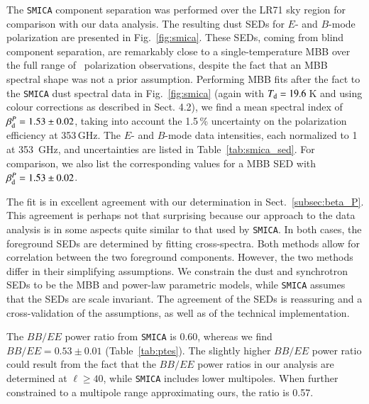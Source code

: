 \documentclass[longauth,traditabstract]{aa}
\begin{document}
The {\tt SMICA} component separation was performed over the LR71 sky region for comparison with our data analysis. 
The resulting dust SEDs for $E$- and $B$-mode polarization are presented in Fig.~\ref{fig:smica}.
These SEDs, coming from blind component separation, are remarkably close to a single-temperature MBB over the full range of \Planck\ polarization observations, despite the fact that an MBB spectral shape was not a prior assumption.  Performing MBB fits after the fact to the {\tt SMICA} dust spectral data in Fig.~\ref{fig:smica}
(again with $T_{\rm d} = 19.6\,$K and using colour corrections as described in Sect. 4.2),
we find a mean spectral index of $\beta_{\rm d}^P = 1.53\pm0.02$, taking into account the 1.5\,\% uncertainty on the polarization efficiency at 353\,GHz.
The $E$- and $B$-mode data intensities, each normalized to 1 at 353\, GHz, and uncertainties are listed in Table~\ref{tab:smica_sed}. For comparison, 
we also list the corresponding values for a MBB SED with $\beta_{\rm d}^P = 1.53\pm0.02$. 

The fit  is in excellent agreement with our determination in Sect.~\ref{subsec:beta_P}.
This agreement is perhaps not that surprising because our approach to the data analysis is in some aspects quite similar to that used by {\tt SMICA}. 
In both cases, the foreground SEDs are determined by fitting cross-spectra. Both methods allow for correlation between the two foreground components. 
However, the two methods differ in their simplifying assumptions. 
We constrain the dust and synchrotron SEDs to be the MBB and power-law parametric models, while {\tt SMICA} assumes that the SEDs are scale invariant. The agreement of the SEDs is reassuring and a cross-validation of the assumptions, as well as of the technical implementation.

The $BB/EE$ power ratio from {\tt SMICA} is 0.60, whereas we find $BB/EE= 0.53\pm0.01$ (Table~\ref{tab:ptes}).
The slightly higher $BB/EE$ power ratio could result 
from the fact that the $BB/EE$ power ratios in our analysis are determined at $\ell \ge 40$, while {\tt SMICA} includes lower multipoles.  When further constrained to a multipole range approximating ours, the ratio is 0.57.
\end{document}
